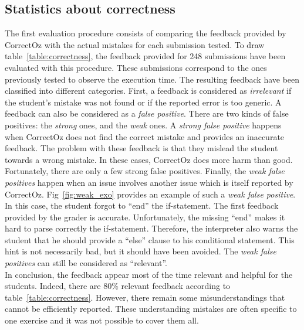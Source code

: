 \documentclass[11pt,a4paper,twoside,openright]{report}
\begin{document}
\subsection{Statistics about correctness} \label{ssec:stat}
The first evaluation procedure consists of comparing the feedback provided by 
CorrectOz with the actual mistakes for each submission tested. To draw 
table~\ref{table:correctness}, the feedback provided for 248 submissions have 
been evaluated with this procedure. These submissions correspond to the ones 
previously tested to observe the execution time. The resulting feedback have 
been classified into different categories. First, a feedback is considered as 
\textit{irrelevant} if 
the student's mistake was not found or if the reported error is too generic. 
A feedback can also be considered as a \textit{false positive}. There are two 
kinds of false positives: the \textit{strong} ones, and the \textit{weak} ones. 
A \textit{strong false positive} happens when CorrectOz does not find the 
correct mistake and provides an inaccurate feedback. The problem with these 
feedback is that they mislead the student towards a wrong mistake. In these 
cases, CorrectOz does more harm than good. Fortunately, there are only a 
few 
strong false positives. Finally, the \textit{weak false positives} happen when 
an issue involves another issue which is itself reported by CorrectOz.  
Fig~\ref{fig:weak_exo} provides an example of such a \textit{weak false 
positive}. In this case, the student forgot to \enquote{end} the if-statement. 
The first feedback provided by the grader is accurate. Unfortunately, 
the missing \enquote{end} makes it hard to parse correctly the if-statement. 
Therefore, the interpreter also warns the student that he should provide a \enquote{else} 
clause to his conditional statement. This hint is not necessarily bad, but it 
should have been avoided. The \textit{weak false positives} can still 
be considered as \enquote{relevant}.\\

In conclusion, the feedback appear most of the time relevant and helpful 
for the students. Indeed, there are 80\% relevant feedback according to 
table~\ref{table:correctness}. However, there remain some misunderstandings that 
cannot be efficiently reported. These understanding mistakes are often 
specific to one exercise and it was not possible to cover them all.
\end{document}
